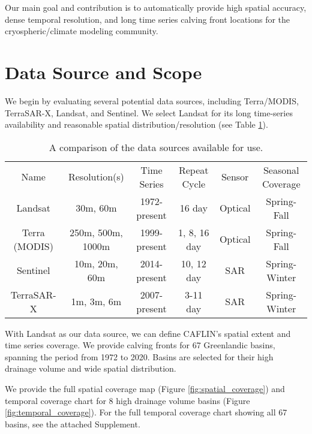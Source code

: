 \documentclass[tc, manuscript]{copernicus}
\begin{document}
Our main goal and contribution is to automatically provide high spatial accuracy, dense temporal resolution, and long time series calving front locations for the cryospheric/climate modeling community.

\section{Data Source and Scope}
\label{sec:datasources}
We begin by evaluating several potential data sources, including Terra/MODIS, TerraSAR-X, Landsat, and Sentinel. We select Landsat for its long time-series availability and reasonable spatial distribution/resolution (see Table \ref{tab:datasources}).

\begin{table}[h]
    \centering
    \caption{A comparison of the data sources available for use.}
    \begin{tabular}{cccccc}
        \hline
        \rowcolor[rgb]{0.71,0.71,0.71} \multicolumn{6}{c}{\textbf{Potential Data Sources}} \\ \hline
        \rowcolor[rgb]{0.71,0.71,0.71} Name & Resolution(s) & Time Series & Repeat Cycle & Sensor & Seasonal Coverage \\ \hline\hline
        Landsat & 30m, 60m & 1972-present & 16 day & Optical & Spring-Fall \\ \hline
        \rowcolor[rgb]{0.886,0.886,0.886} Terra (MODIS) & 250m, 500m, 1000m & 1999-present & 1, 8, 16 day & Optical & Spring-Fall \\ \hline
        Sentinel & 10m, 20m, 60m & 2014-present & 10, 12 day & SAR & Spring-Winter\\ \hline
        \rowcolor[rgb]{0.886,0.886,0.886} TerraSAR-X & 1m, 3m, 6m & 2007-present & 3-11 day & SAR & Spring-Winter\\ \hline
    \end{tabular}
    \label{tab:datasources}
\end{table}

With Landsat as our data source, we can define CAFLIN's spatial extent and time series coverage. We provide calving fronts for 67 Greenlandic basins, spanning the period from 1972 to 2020. Basins are selected for their high drainage volume and wide spatial distribution.

We provide the full spatial coverage map (Figure \ref{fig:spatial_coverage}) and temporal coverage chart for 8 high drainage volume basins (Figure \ref{fig:temporal_coverage}).  For the full temporal coverage chart showing all 67 basins, see the attached Supplement.
\end{document}
